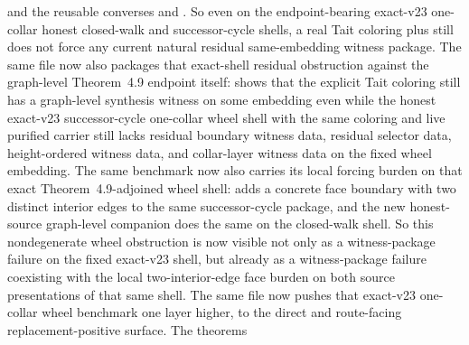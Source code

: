 \documentclass[11pt]{article}
\begin{document}
\begin{itemize}
and the reusable converses
and
.
So even on the endpoint-bearing exact-v23 one-collar honest closed-walk and
successor-cycle shells, a real Tait coloring plus
 still does not force any current natural
residual same-embedding witness package.
The same file now also packages that exact-shell residual
obstruction against the graph-level Theorem~4.9 endpoint itself:
shows that the explicit Tait coloring still has a graph-level synthesis
witness on some embedding even while the honest exact-v23 successor-cycle
one-collar wheel shell with the same coloring and live purified carrier still
lacks residual boundary witness data, residual selector data,
height-ordered witness data, and collar-layer witness data on the fixed wheel
embedding.  The same benchmark now also carries its local forcing burden on
that exact Theorem~4.9-adjoined wheel shell:
adds a concrete face boundary with two distinct interior edges to the same
successor-cycle package, and the new honest-source graph-level companion
does the same on the closed-walk shell.  So this nondegenerate wheel
obstruction is now visible not only as a witness-package failure on the fixed
exact-v23 shell, but already as a witness-package failure coexisting with the
local two-interior-edge face burden on both source presentations of that same
shell.  The same file now pushes that exact-v23 one-collar wheel
benchmark one layer higher, to the direct and route-facing replacement-positive
surface.  The theorems

\end{itemize}
\end{document}
